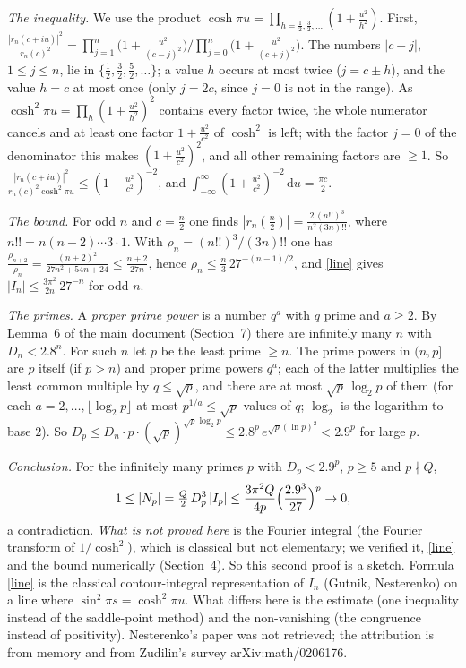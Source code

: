 \documentclass[11pt]{article}
\newcommand{\dd}{\,\mathrm d}
\begin{document}
\emph{The inequality.} We use the product
$\cosh\pi u=\prod_{h=\frac12,\frac32,\dots}(1+\frac{u^2}{h^2})$. First,
$\frac{|r_n(c+iu)|^2}{r_n(c)^2}=\prod_{j=1}^n\bigl(1+\frac{u^2}{(c-j)^2}\bigr)\big/
\prod_{j=0}^n\bigl(1+\frac{u^2}{(c+j)^2}\bigr)$. The numbers $|c-j|$, $1\le j\le n$, lie in
$\{\frac12,\frac32,\frac52,\dots\}$; a value $h$ occurs at most twice ($j=c\pm h$), and the value $h=c$ at most once (only
$j=2c$, since $j=0$ is not in the range). As $\cosh^2\pi u=\prod_h(1+\frac{u^2}{h^2})^2$ contains
every factor twice, the whole numerator cancels and at least one factor $1+\frac{u^2}{c^2}$ of
$\cosh^2$ is left; with the factor $j=0$ of the denominator this makes $(1+\frac{u^2}{c^2})^2$, and
all other remaining factors are $\ge1$. So
$\frac{|r_n(c+iu)|^2}{r_n(c)^2\cosh^2\pi u}\le(1+\frac{u^2}{c^2})^{-2}$, and
$\int_{-\infty}^\infty(1+\frac{u^2}{c^2})^{-2}\dd u=\frac{\pi c}2$.

\emph{The bound.} For odd $n$ and $c=\frac n2$ one finds $|r_n(\frac n2)|=\frac{2\,(n!!)^3}{n^2(3n)!!}$,
where $n!!=n(n-2)\cdots3\cdot1$. With $\rho_n=(n!!)^3/(3n)!!$ one has
$\frac{\rho_{n+2}}{\rho_n}=\frac{(n+2)^2}{27n^2+54n+24}\le\frac{n+2}{27n}$, hence
$\rho_n\le\frac n3\,27^{-(n-1)/2}$, and \eqref{line} gives
$|I_n|\le\frac{3\pi^2}{2n}\,27^{-n}$ for odd $n$.

\emph{The primes.} A \emph{proper prime power} is a number $q^a$ with $q$ prime and $a\ge2$. By
Lemma~6 of the main document (Section~7) there are infinitely many $n$ with $D_n<2.8^n$. For such
$n$ let $p$ be the least prime $\ge n$. The prime powers in $(n,p]$ are $p$ itself (if $p>n$) and
proper prime powers $q^a$; each of the latter multiplies the least common multiple by $q\le\sqrt p$,
and there are at most $\sqrt p\,\log_2p$ of them (for each $a=2,\dots,\lfloor\log_2p\rfloor$ at most
$p^{1/a}\le\sqrt p$ values of $q$; $\log_2$ is the logarithm to base $2$). So
$D_p\le D_n\cdot p\cdot(\sqrt p)^{\sqrt p\log_2p}\le2.8^p\,e^{\sqrt p(\ln p)^2}<2.9^p$ for large $p$.

\emph{Conclusion.} For the infinitely many primes $p$ with $D_p<2.9^p$, $p\ge5$ and $p\nmid Q$,
\[
1\le|N_p|=\tfrac Q2\,D_p^3\,|I_p|\le\frac{3\pi^2Q}{4p}\Bigl(\frac{2.9^3}{27}\Bigr)^p\to0,
\]
a contradiction. \emph{What is not proved here} is the Fourier integral (the Fourier transform of
$1/\cosh^2$), which is classical but not elementary; we verified it, \eqref{line} and the bound
numerically (Section~4). So this second proof is a sketch. Formula \eqref{line} is the classical
contour-integral representation of $I_n$ (Gutnik, Nesterenko) on a line where
$\sin^2\pi s=\cosh^2\pi u$. What differs here is the estimate (one inequality instead of the
saddle-point method) and the non-vanishing (the congruence instead of positivity). Nesterenko's
paper was not retrieved; the attribution is from memory and from Zudilin's survey
arXiv:math/0206176.
\end{document}

